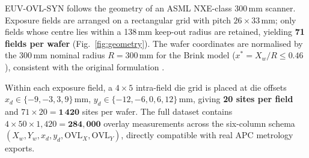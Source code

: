\documentclass[10pt,conference]{IEEEtran}
\begin{document}
\textsc{EUV-OVL-SYN} follows the geometry of an ASML NXE-class
300\,mm scanner.  Exposure fields are arranged on a rectangular grid with
pitch $26\!\times\!33$\,mm; only fields whose centre lies within a
138\,mm keep-out radius are retained, yielding \textbf{71 fields per wafer}
(Fig.~\ref{fig:geometry}).  The wafer coordinates are normalised by the
300\,mm nominal radius $R=300$\,mm for the Brink model
($x^* = X_w/R \le 0.46$), consistent with the original formulation
\cite{vandenBrink1996}.

Within each exposure field, a $4\!\times\!5$ intra-field die grid is placed
at die offsets $x_d \!\in\!\{-9, -3, 3, 9\}$\,mm,
$y_d\!\in\!\{-12, -6, 0, 6, 12\}$\,mm, giving \textbf{20 sites per field}
and $71 \times 20 = \mathbf{1\,420}$ sites per wafer.
The full dataset contains $4 \times 50 \times 1{,}420 = \mathbf{284{,}000}$
overlay measurements across the six-column schema
$(X_w, Y_w, x_d, y_d, \mathrm{OVL}_X, \mathrm{OVL}_Y)$, directly
compatible with real APC metrology exports.
\end{document}

